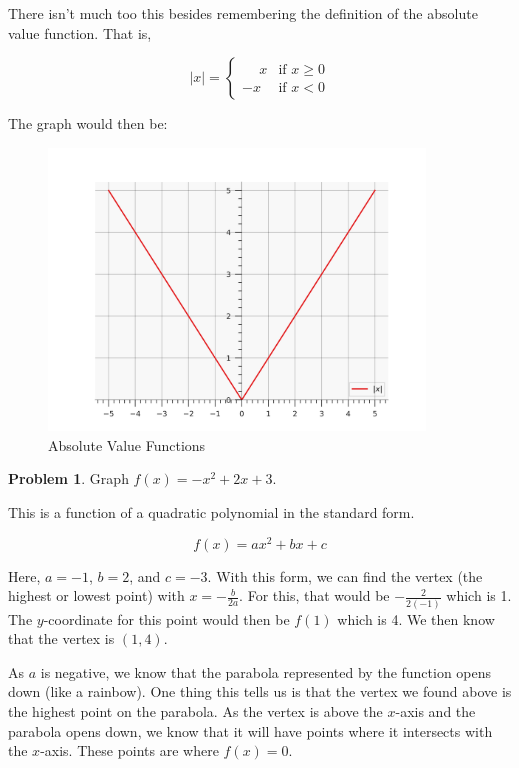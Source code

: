\documentclass[12pt]{article}
\theoremstyle{definition}
\newtheorem{problem}{Problem}
\begin{document}
There isn't much too this besides remembering the definition of the absolute value function.
That is,

\begin{equation}
    |x| =
    \begin{cases}
        \phantom{-} x & \text{if } x \geq 0 \\
        -x            & \text{if } x < 0
    \end{cases}
\end{equation}

The graph would then be:

\begin{figure}[H]
    \centering
    \includegraphics[width=10cm, keepaspectratio]{graph_2.png}
    \caption{Absolute Value Functions}
    \label{fig:fig2}
\end{figure}

\begin{problem}
Graph $f(x) = -x^2+2x+3$.
\end{problem}

This is a function of a quadratic polynomial in the standard form.

\begin{equation}
    f(x) = ax^2 + bx + c
\end{equation}

Here, $a=-1$, $b=2$, and $c=-3$.
With this form, we can find the vertex (the highest or lowest point) with $x=-\frac{b}{2a}$.
For this, that would be $-\frac{2}{2(-1)}$ which is 1.
The $y$-coordinate for this point would then be $f(1)$ which is 4.
We then know that the vertex is $(1, 4)$.

As $a$ is negative, we know that the parabola represented by the function opens down (like a rainbow).
One thing this tells us is that the vertex we found above is the highest point on the parabola.
As the vertex is above the $x$-axis and the parabola opens down, we know that it will have points where it intersects with the $x$-axis.
These points are where $f(x)=0$.
\end{document}
